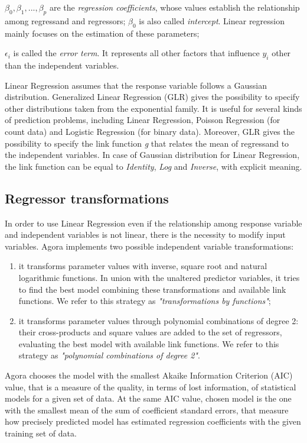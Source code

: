 $\beta_0, \beta_1, ..., \beta_p$ are the \textit{regression coefficients}, whose values establish the relationship among regressand and regressors; $\beta_0$ is also called \textit{intercept}. Linear regression mainly focuses on the estimation of these parameters;

$\epsilon_i$ is called the \textit{error term}. It represents all other factors that influence $y_i$ other than the independent variables.

Linear Regression assumes that the response variable follows a Gaussian distribution. Generalized Linear Regression (GLR) gives the possibility to specify other distributions taken from the exponential family. It is useful for several kinds of prediction problems, including Linear Regression, Poisson Regression (for count data) and Logistic Regression (for binary data). Moreover, GLR gives the possibility to specify the link function \textit{g} that relates the mean of regressand to the independent variables. In case of Gaussian distribution for Linear Regression, the link function can be equal to \textit{Identity}, \textit{Log} and \textit{Inverse}, with explicit meaning.


\subsection{Regressor transformations}\label{regrTransforms}

In order to use Linear Regression even if the relationship among response variable and independent variables is not linear, there is the necessity to modify input variables. Agora implements two possible independent variable transformations:

\begin{enumerate}

    \item it transforms parameter values with inverse, square root and natural logarithmic functions. In union with the unaltered predictor variables, it tries to find the best model combining these transformations and available link functions. We refer to this strategy as \textit{"transformations by functions"};
    
    \item it transforms parameter values through polynomial combinations of degree 2: their cross-products and square values are added to the set of regressors, evaluating the best model with available link functions. We refer to this strategy as \textit{"polynomial combinations of degree 2"}.

\end{enumerate}

Agora chooses the model with the smallest Akaike Information Criterion (AIC) value, that is a measure of the quality, in terms of lost information, of statistical models for a given set of data. At the same AIC value, chosen model is the one with the smallest mean of the sum of coefficient standard errors, that measure how precisely predicted model has estimated regression coefficients with the given training set of data.
